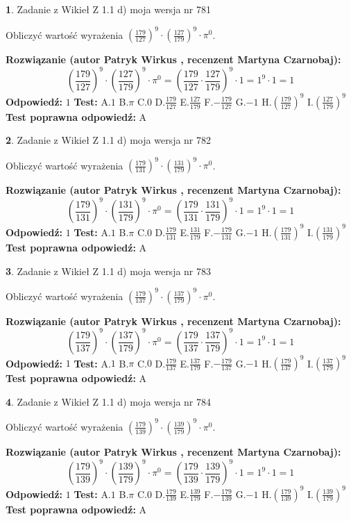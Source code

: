 \documentclass[12pt, a4paper]{article}
\theoremstyle{definition} %
\newtheorem{zad}{}
\newcommand{\zadStart}[1]{\begin{zad}#1\newline}
\newcommand{\zadStop}{\end{zad}}
\newcommand{\rozwStart}[2]{\noindent \textbf{Rozwiązanie (autor #1 , recenzent #2): }\newline}
\newcommand{\rozwStop}{\newline}
\newcommand{\odpStart}{\noindent \textbf{Odpowiedź:}\newline}
\newcommand{\odpStop}{\newline}
\newcommand{\testStart}{\noindent \textbf{Test:}\newline}
\newcommand{\testStop}{\newline}
\newcommand{\kluczStart}{\noindent \textbf{Test poprawna odpowiedź:}\newline}
\newcommand{\kluczStop}{\newline}
\begin{document}
\zadStart{Zadanie z Wikieł Z 1.1 d) moja wersja nr 781}

Obliczyć wartość wyrażenia $(\frac{179}{127})^{9} \cdot (\frac{127}{179})^{9} \cdot \pi^{0}$.
\zadStop
\rozwStart{Patryk Wirkus}{Martyna Czarnobaj}
$$(\frac{179}{127})^{9} \cdot (\frac{127}{179})^{9} \cdot \pi^{0} = (\frac{179}{127} \cdot \frac{127}{179})^{9} \cdot 1 = 1^{9} \cdot 1 = 1$$
\rozwStop
\odpStart
$1$
\odpStop
\testStart
A.$1$ B.$\pi$ C.$0$ D.$\frac{179}{127}$ E.$\frac{127}{179}$
F.$-\frac{179}{127}$ G.$-1$
H.$(\frac{179}{127})^{9}$
I.$(\frac{127}{179})^{9}$
\testStop
\kluczStart
A
\kluczStop



\zadStart{Zadanie z Wikieł Z 1.1 d) moja wersja nr 782}

Obliczyć wartość wyrażenia $(\frac{179}{131})^{9} \cdot (\frac{131}{179})^{9} \cdot \pi^{0}$.
\zadStop
\rozwStart{Patryk Wirkus}{Martyna Czarnobaj}
$$(\frac{179}{131})^{9} \cdot (\frac{131}{179})^{9} \cdot \pi^{0} = (\frac{179}{131} \cdot \frac{131}{179})^{9} \cdot 1 = 1^{9} \cdot 1 = 1$$
\rozwStop
\odpStart
$1$
\odpStop
\testStart
A.$1$ B.$\pi$ C.$0$ D.$\frac{179}{131}$ E.$\frac{131}{179}$
F.$-\frac{179}{131}$ G.$-1$
H.$(\frac{179}{131})^{9}$
I.$(\frac{131}{179})^{9}$
\testStop
\kluczStart
A
\kluczStop



\zadStart{Zadanie z Wikieł Z 1.1 d) moja wersja nr 783}

Obliczyć wartość wyrażenia $(\frac{179}{137})^{9} \cdot (\frac{137}{179})^{9} \cdot \pi^{0}$.
\zadStop
\rozwStart{Patryk Wirkus}{Martyna Czarnobaj}
$$(\frac{179}{137})^{9} \cdot (\frac{137}{179})^{9} \cdot \pi^{0} = (\frac{179}{137} \cdot \frac{137}{179})^{9} \cdot 1 = 1^{9} \cdot 1 = 1$$
\rozwStop
\odpStart
$1$
\odpStop
\testStart
A.$1$ B.$\pi$ C.$0$ D.$\frac{179}{137}$ E.$\frac{137}{179}$
F.$-\frac{179}{137}$ G.$-1$
H.$(\frac{179}{137})^{9}$
I.$(\frac{137}{179})^{9}$
\testStop
\kluczStart
A
\kluczStop



\zadStart{Zadanie z Wikieł Z 1.1 d) moja wersja nr 784}

Obliczyć wartość wyrażenia $(\frac{179}{139})^{9} \cdot (\frac{139}{179})^{9} \cdot \pi^{0}$.
\zadStop
\rozwStart{Patryk Wirkus}{Martyna Czarnobaj}
$$(\frac{179}{139})^{9} \cdot (\frac{139}{179})^{9} \cdot \pi^{0} = (\frac{179}{139} \cdot \frac{139}{179})^{9} \cdot 1 = 1^{9} \cdot 1 = 1$$
\rozwStop
\odpStart
$1$
\odpStop
\testStart
A.$1$ B.$\pi$ C.$0$ D.$\frac{179}{139}$ E.$\frac{139}{179}$
F.$-\frac{179}{139}$ G.$-1$
H.$(\frac{179}{139})^{9}$
I.$(\frac{139}{179})^{9}$
\testStop
\kluczStart
A
\kluczStop
\end{document}
